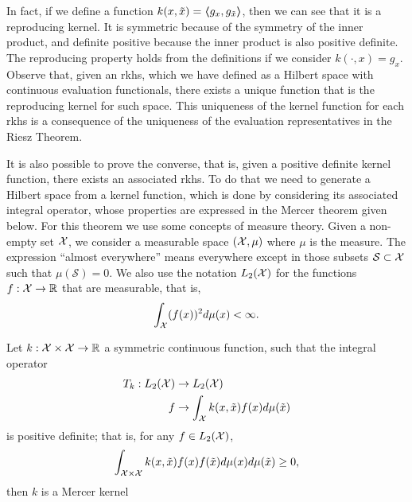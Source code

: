 In fact, if we define a function $k(x, \tilde{x}) = \bm{\left\langle} g_x, g_{\tilde{x}} \bm{\right\rangle}$, then we can see that it is a reproducing kernel. It is symmetric because of the symmetry of the inner product, and definite positive because the inner product is also positive definite. The reproducing property 
holds from the definitions if we consider $k(\cdot, x) = g_x$.
%
Observe that, given an \acrshort{rkhs}, which we have defined as a Hilbert space with continuous evaluation functionals, there exists a unique function that is the reproducing kernel for such space. This uniqueness of the kernel function for each \acrshort{rkhs} is a consequence of the uniqueness of the evaluation representatives in the Riesz Theorem.
%

It is also possible to prove the converse, that is, given a positive definite kernel function, there exists an associated \acrshort{rkhs}.
To do that we need to generate a Hilbert space from a kernel function, which is done by considering its associated integral operator, whose properties are expressed in the Mercer theorem given below. For this theorem we use some concepts of measure theory. 
%
Given a non-empty set $\mathcal{X}$, we consider a measurable space $(\mathcal{X}, \mu)$ where $\mu$ is the measure. The expression ``almost everywhere'' means everywhere except in those subsets $\mathcal{S} \subset \mathcal{X}$ such that $\mu(\mathcal{S}) = 0$. We also use the notation $L_2(\mathcal{X})$ for the functions $f: \mathcal{X} \to \mathbb{R}$ that are measurable, that is,
$$ \int_{\mathcal{X}} (f(x))^2 d\mu(x) < \infty .$$

\begin{definition}
    Let $k: \mathcal{X} \times \mathcal{X} \to \mathbb{R}$ a symmetric continuous function, such that the integral operator 
    \begin{equation}
        \begin{aligned}
    \nonumber
    T_k: L_2(\mathcal{X}) &\to L_2(\mathcal{X}) \\
    f &\to \int_{\mathcal{X}} k(x, \tilde{x}) f(x) d \mu(\tilde{x}) 
\end{aligned}
\end{equation}    
is positive definite; that is, for any $f \in L_2(\mathcal{X})$, 
\begin{equation}
    \nonumber
    \int_{\mathcal{X} \times \mathcal{X}} k(x, \tilde{x}) f(x) f(\tilde{x}) d\mu(x) d\mu(\tilde{x}) \geq 0 ,
\end{equation}
then $k$ is a Mercer kernel
\end{definition}

